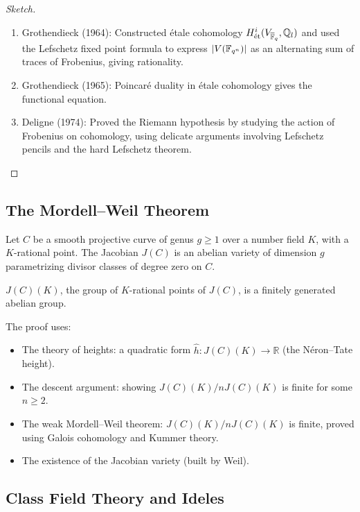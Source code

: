 \begin{proof}[Sketch]
\begin{enumerate}
    \item Grothendieck (1964): Constructed \'{e}tale cohomology $H_{\text{\'{e}t}}^i(V_{\overline{\mathbb{F}}_q}, \mathbb{Q}_l)$ and used the Lefschetz fixed point formula to express $|V(\mathbb{F}_{q^n})|$ as an alternating sum of traces of Frobenius, giving rationality.
    \item Grothendieck (1965): Poincar\'{e} duality in \'{e}tale cohomology gives the functional equation.
    \item Deligne (1974): Proved the Riemann hypothesis by studying the action of Frobenius on cohomology, using delicate arguments involving Lefschetz pencils and the hard Lefschetz theorem.
\end{enumerate}
\end{proof}

\subsection{The Mordell--Weil Theorem}

Let $C$ be a smooth projective curve of genus $g \geq 1$ over a number field $K$, with a $K$-rational point. The Jacobian $J(C)$ is an abelian variety of dimension $g$ parametrizing divisor classes of degree zero on $C$.

\begin{theorem}
$J(C)(K)$, the group of $K$-rational points of $J(C)$, is a finitely generated abelian group.
\end{theorem}

The proof uses:
\begin{itemize}
    \item The theory of heights: a quadratic form $\hat{h}: J(C)(K) \to \mathbb{R}$ (the N\'{e}ron--Tate height).
    \item The descent argument: showing $J(C)(K)/nJ(C)(K)$ is finite for some $n \geq 2$.
    \item The weak Mordell--Weil theorem: $J(C)(K)/nJ(C)(K)$ is finite, proved using Galois cohomology and Kummer theory.
    \item The existence of the Jacobian variety (built by Weil).
\end{itemize}

\subsection{Class Field Theory and Ideles}

